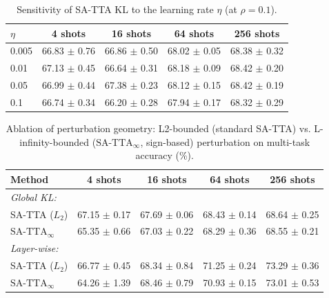 \documentclass{article}
\theoremstyle{plain}
\theoremstyle{definition}
\theoremstyle{remark}
\begin{document}
\begin{table}[H]
\centering
\caption{Sensitivity of SA-TTA KL to the learning rate $\eta$ (at $\rho=0.1$).}
\label{tab:lr_sensitivity}
\vskip 0.05in
\setlength{\tabcolsep}{6pt}
\small
\begin{tabular}{lcccc}
\toprule
$\eta$ & 4 shots & 16 shots & 64 shots & 256 shots \\
\midrule
0.005 & 66.83 $\pm$ 0.76 & 66.86 $\pm$ 0.50 & 68.02 $\pm$ 0.05 & 68.38 $\pm$ 0.32 \\
0.01 & 67.13 $\pm$ 0.45 & 66.64 $\pm$ 0.31 & 68.18 $\pm$ 0.09 & 68.42 $\pm$ 0.20 \\
0.05 & 66.99 $\pm$ 0.44 & 67.38 $\pm$ 0.23 & 68.12 $\pm$ 0.15 & 68.42 $\pm$ 0.19 \\
0.1 & 66.74 $\pm$ 0.34 & 66.20 $\pm$ 0.28 & 67.94 $\pm$ 0.17 & 68.32 $\pm$ 0.29 \\
\bottomrule
\end{tabular}
\end{table}

\begin{table}[H]
\centering
\caption{Ablation of perturbation geometry: L2-bounded (standard SA-TTA) vs. L-infinity-bounded ($\text{SA-TTA}_{\infty}$, sign-based) perturbation on multi-task accuracy (\%).}
\label{tab:ablation_geometry}
\vskip 0.05in
\setlength{\tabcolsep}{6pt}
\small
\begin{tabular}{lcccc}
\toprule
Method & 4 shots & 16 shots & 64 shots & 256 shots \\
\midrule
\textit{Global KL:} \\
SA-TTA ($L_2$) & 67.15 $\pm$ 0.17 & 67.69 $\pm$ 0.06 & 68.43 $\pm$ 0.14 & 68.64 $\pm$ 0.25 \\
$\text{SA-TTA}_{\infty}$ & 65.35 $\pm$ 0.66 & 67.03 $\pm$ 0.22 & 68.29 $\pm$ 0.36 & 68.55 $\pm$ 0.21 \\
\midrule
\textit{Layer-wise:} \\
SA-TTA ($L_2$) & 66.77 $\pm$ 0.45 & 68.34 $\pm$ 0.84 & 71.25 $\pm$ 0.24 & 73.29 $\pm$ 0.36 \\
$\text{SA-TTA}_{\infty}$ & 64.26 $\pm$ 1.39 & 68.46 $\pm$ 0.79 & 70.93 $\pm$ 0.15 & 73.01 $\pm$ 0.53 \\
\bottomrule
\end{tabular}
\end{table}
\end{document}
